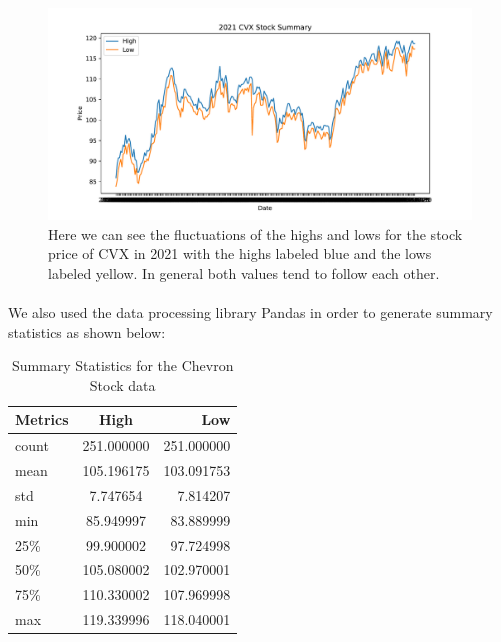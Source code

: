 \documentclass[12pt, letterpaper, titlepage]{article}
\begin{document}
\begin{figure}[!hb]
  \begin{center}
  \includegraphics[width=\textwidth]{../figures/fig1.pdf}
  \caption{Here we can see the fluctuations of the highs and lows for the stock price of CVX in 2021 with the highs labeled blue and the lows labeled yellow. In general both values tend to follow each other.}\label{fig:fig1}
  \end{center}
\end{figure}

\paragraph{}
	We also used the data processing library Pandas in order to generate summary statistics as shown below:

\begin{table}[!hb]
  \begin{center}
    \caption{Summary Statistics for the Chevron Stock data}
    \label{tab:table1}
    \begin{tabular}{l|c|r} %
      \textbf{Metrics} & \textbf{High} & \textbf{Low}\\
      \hline
      count & 251.000000 & 251.000000\\
      mean & 105.196175 & 103.091753\\
      std & 7.747654 & 7.814207\\
      min & 85.949997 & 83.889999\\
      25\% & 99.900002 & 97.724998\\
      50\% & 105.080002 & 102.970001\\
      75\% & 110.330002 & 107.969998\\
      max & 119.339996 & 118.040001\\
    \end{tabular}
  \end{center}
\end{table}
\end{document}
